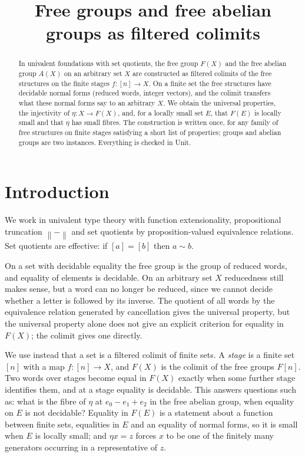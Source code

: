 \documentclass[11pt]{amsart}
\title[Free groups as filtered colimits]{Free groups and free abelian groups as filtered colimits}
\date{}
\theoremstyle{definition}
\theoremstyle{remark}
\newcommand{\mere}[1]{\left\lVert #1\right\rVert}
\begin{document}
\begin{abstract}
In univalent foundations with set quotients, the free group $F(X)$ and the
free abelian group $A(X)$ on an arbitrary set $X$ are constructed as
filtered colimits of the free structures on the finite stages
$f:[n]\to X$. On a finite set the free structures have decidable normal
forms (reduced words, integer vectors), and the colimit transfers what
these normal forms say to an arbitrary $X$. We obtain the universal
properties, the injectivity of $\eta:X\to F(X)$, and, for a locally small
set $E$, that $F(E)$ is locally small and that $\eta$ has small fibres.
The construction is written once, for any family of free structures on
finite stages satisfying a short list of properties; groups and abelian
groups are two instances. Everything is checked in Unit.
\end{abstract}
\maketitle

\section{Introduction}

We work in univalent type theory with function extensionality,
propositional truncation $\mere{-}$ and set quotients by proposition-valued
equivalence relations. Set quotients are effective: if $[a]=[b]$ then
$a\sim b$.

On a set with decidable equality the free group is the group of reduced
words, and equality of elements is decidable. On an arbitrary set $X$
reducedness still makes sense, but a word can no longer be reduced, since
we cannot decide whether a letter is followed by its inverse. The quotient
of all words by the equivalence relation generated by cancellation gives
the universal property, but the universal property alone does not give an
explicit criterion for equality in $F(X)$; the colimit gives one
directly.

We use instead that a set is a filtered colimit of finite sets. A
\emph{stage} is a finite set $[n]$ with a map $f:[n]\to X$, and $F(X)$ is
the colimit of the free groups $F[n]$. Two words over stages become equal
in $F(X)$ exactly when some further stage identifies them, and at a stage
equality is decidable. This answers questions such as: what is the fibre
of $\eta$ at $e_0-e_1+e_2$ in the free abelian group, when equality on
$E$ is not decidable? Equality in
$F(E)$ is a statement about a function between finite sets, equalities in
$E$ and an equality of normal forms, so it is small when $E$ is locally
small; and $\eta x=z$ forces $x$ to be one of the finitely many generators
occurring in a representative of $z$.
\end{document}
